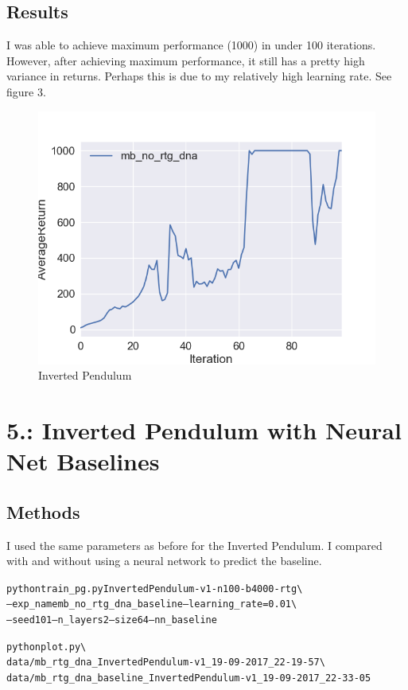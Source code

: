 \documentclass{article}\usepackage[]{graphicx}\usepackage[]{color}
\makeatletter
\newenvironment{kframe}{%
 \def\at@end@of@kframe{}%
 \ifinner\ifhmode%
  \def\at@end@of@kframe{\end{minipage}}%
  \begin{minipage}{\columnwidth}%
 \fi\fi%
 \def\FrameCommand##1{\hskip\@totalleftmargin \hskip-\fboxsep
 \colorbox{shadecolor}{##1}\hskip-\fboxsep
     \hskip-\linewidth \hskip-\@totalleftmargin \hskip\columnwidth}%
 \MakeFramed {\advance\hsize-\width
   \@totalleftmargin\z@ \linewidth\hsize
   \@setminipage}}%
 {\par\unskip\endMakeFramed%
 \at@end@of@kframe}
\newenvironment{knitrout}{}{} %
\makeatother
\begin{document}
\subsection*{Results}

I was able to achieve maximum performance (1000) in under 100 iterations. However, after achieving maximum performance, it still has a pretty high variance in returns. Perhaps this is due to my relatively high learning rate. See figure 3. 


\begin{figure}
  \includegraphics[width=\linewidth]{figures/inverted_pendulum_3.png}
  \caption{Inverted Pendulum}
  \label{pendulum3}
\end{figure}


\section*{5.: Inverted Pendulum with Neural Net Baselines}

\subsection*{Methods}

I used the same parameters as before for the Inverted Pendulum. I compared with and without using a neural network to predict the baseline. 

\begin{knitrout}
\color{fgcolor}\begin{kframe}
\begin{alltt}
python train_pg.py InvertedPendulum-v1 -n 100 -b 4000 -rtg \textbackslash{} 
--exp_name mb_no_rtg_dna_baseline --learning_rate=0.01 \textbackslash{} 
--seed 101 --n_layers 2 --size 64 --nn_baseline

python plot.py \textbackslash{} 
data/mb_rtg_dna_InvertedPendulum-v1_19-09-2017_22-19-57 \textbackslash{} 
data/mb_rtg_dna_baseline_InvertedPendulum-v1_19-09-2017_22-33-05


\end{alltt}
\end{kframe}
\end{knitrout}
\end{document}
